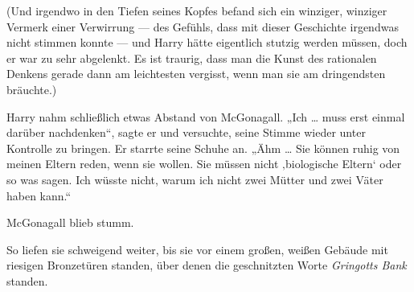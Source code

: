 (Und irgendwo in den Tiefen seines Kopfes befand sich ein winziger, winziger Vermerk einer Verwirrung — des Gefühls, dass mit dieser Geschichte irgendwas nicht stimmen konnte — und Harry hätte eigentlich stutzig werden müssen, doch er war zu sehr abgelenkt. Es ist traurig, dass man die Kunst des rationalen Denkens gerade dann am leichtesten vergisst, wenn man sie am dringendsten bräuchte.)

Harry nahm schließlich etwas Abstand von McGonagall.
„Ich … muss erst einmal darüber nachdenken“, sagte er und versuchte, seine Stimme wieder unter Kontrolle zu bringen. Er starrte seine Schuhe an. „Ähm … Sie können ruhig von meinen Eltern reden, wenn sie wollen. Sie müssen nicht ‚biologische Eltern‘ oder so was sagen. Ich wüsste nicht, warum ich nicht zwei Mütter und zwei Väter haben kann.“

McGonagall blieb stumm.

So liefen sie schweigend weiter, bis sie vor einem großen, weißen Gebäude mit riesigen Bronzetüren standen, über denen die geschnitzten Worte \emph{Gringotts Bank} standen.

